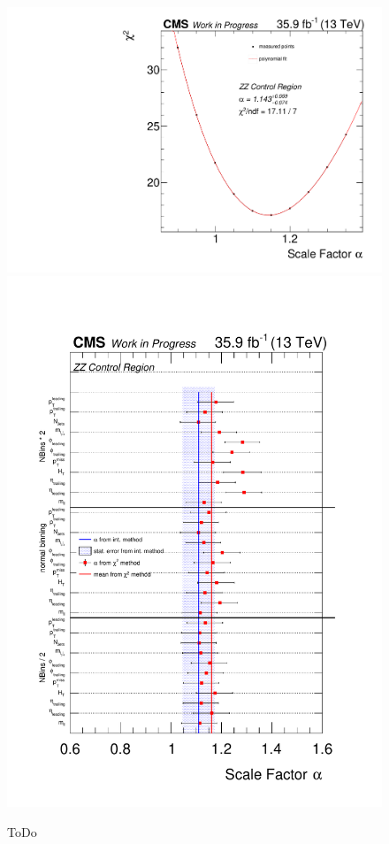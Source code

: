 \begin{figure}[htb]
 \centering
 \includegraphics[width=\pairwidth]{figures/plots_CR/chi/ZZ_met}
 \includegraphics[width=\pairwidth]{figures/plots_CR/chi/ZZ_Compare}
 \caption{ToDo}
 \label{fig:chiZZ}
\end{figure}

